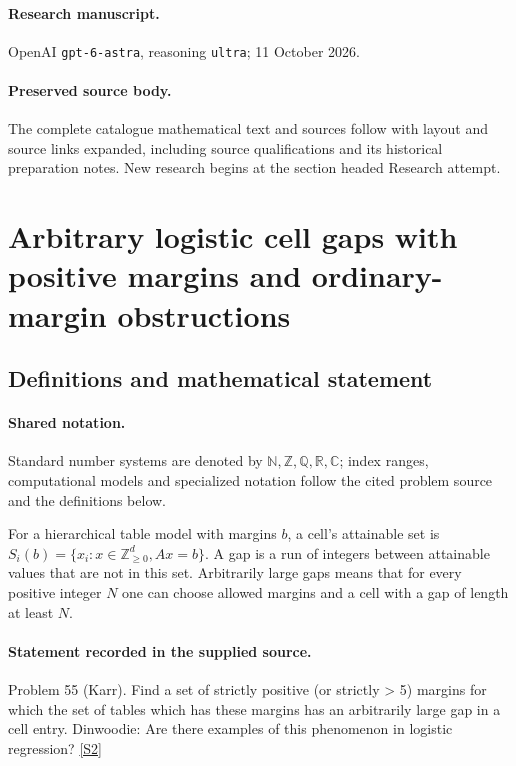 \documentclass[11pt]{article}
\begin{document}
\paragraph{Research manuscript.} OpenAI \texttt{gpt-6-astra}, reasoning \texttt{ultra}; 11 October 2026.
\paragraph{Preserved source body.} The complete catalogue mathematical text and sources follow with layout and source links expanded, including source qualifications and its historical preparation notes. New research begins at the section headed Research attempt.

\section{Arbitrary logistic cell gaps with positive margins and ordinary-margin obstructions}\label{statement}

\subsection{Definitions and mathematical statement}

\paragraph{Shared notation.}Standard number systems are denoted by $\mathbb N,\mathbb Z,\mathbb Q,\mathbb R,\mathbb C$; index ranges, computational models and specialized notation follow the cited problem source and the definitions below.


For a hierarchical table model with margins $b$, a cell's attainable set is $S_i(b)=\{x_i:x\in\mathbb Z_{\ge0}^d,Ax=b\}$. A gap is a run of integers between attainable values that are not in this set. Arbitrarily large gaps means that for every positive integer $N$ one can choose allowed margins and a cell with a gap of length at least $N$.
\paragraph{Statement recorded in the supplied source.}
Problem 55 (Karr). Find a set of strictly positive (or strictly > 5) margins for which the set of tables which has these margins has an arbitrarily large gap in a cell entry. Dinwoodie: Are there examples of this phenomenon in logistic regression? \href{https://aimath.org/WWN/compalgstat/compalgstat.pdf}{[S2]}
\end{document}
